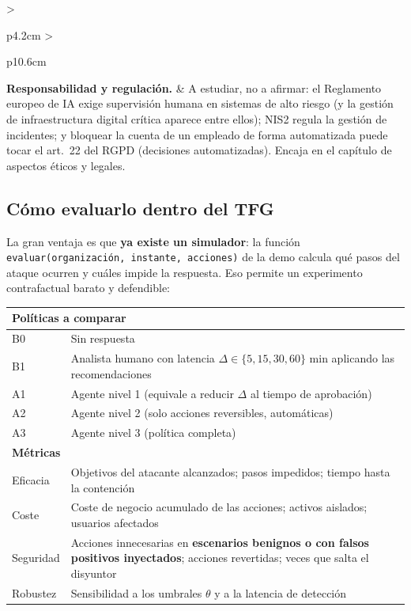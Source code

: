 \documentclass[11pt,a4paper]{article}
\newcommand{\cod}[1]{\texttt{#1}}
\begin{document}
\begin{longtable}{>{\raggedright\arraybackslash}p{4.2cm} >{\raggedright\arraybackslash}p{10.6cm}}
\textbf{Responsabilidad y regulación.} & A estudiar, no a afirmar: el Reglamento europeo de IA exige supervisión humana en sistemas de alto riesgo (y la gestión de infraestructura digital crítica aparece entre ellos); NIS2 regula la gestión de incidentes; y bloquear la cuenta de un empleado de forma automatizada puede tocar el art.\ 22 del RGPD (decisiones automatizadas). Encaja en el capítulo de aspectos éticos y legales. \\
\bottomrule
\end{longtable}

\subsection{Cómo evaluarlo dentro del TFG}

La gran ventaja es que \textbf{ya existe un simulador}: la función \cod{evaluar(organización, instante, acciones)} de
la demo calcula qué pasos del ataque ocurren y cuáles impide la respuesta. Eso permite un experimento contrafactual
barato y defendible:

\begin{center}
\small
\begin{tabularx}{\linewidth}{l X}
\toprule
\multicolumn{2}{l}{\textbf{Políticas a comparar}}\\
\midrule
B0 & Sin respuesta \\
B1 & Analista humano con latencia $\Delta \in \{5, 15, 30, 60\}$ min aplicando las recomendaciones \\
A1 & Agente nivel 1 (equivale a reducir $\Delta$ al tiempo de aprobación) \\
A2 & Agente nivel 2 (solo acciones reversibles, automáticas) \\
A3 & Agente nivel 3 (política completa) \\
\midrule
\multicolumn{2}{l}{\textbf{Métricas}}\\
\midrule
Eficacia & Objetivos del atacante alcanzados; pasos impedidos; tiempo hasta la contención \\
Coste & Coste de negocio acumulado de las acciones; activos aislados; usuarios afectados \\
Seguridad & Acciones innecesarias en \textbf{escenarios benignos o con falsos positivos inyectados}; acciones revertidas; veces que salta el disyuntor \\
Robustez & Sensibilidad a los umbrales $\theta$ y a la latencia de detección \\
\bottomrule
\end{tabularx}
\end{center}
\end{document}
